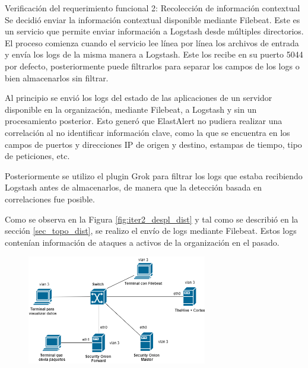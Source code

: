 \begin{section}{Verificación del requerimiento funcional 2: Recolección de información contextual}
    Se decidió enviar la información contextual disponible mediante Filebeat. Este es un servicio que permite enviar información a Logstash desde múltiples directorios. El proceso comienza cuando el servicio lee línea por línea los archivos de entrada y envía los logs de la misma manera a Logstash. Este los recibe en su puerto 5044 por defecto, posteriormente puede filtrarlos para separar los campos de los logs o bien almacenarlos sin filtrar. \par
    Al principio se envió los logs del estado de las aplicaciones de un servidor disponible en la organización, mediante Filebeat, a Logstash y sin un procesamiento posterior. Esto generó que ElastAlert no pudiera realizar una correlación al no identificar información clave, como la que se encuentra en los campos de puertos y direcciones IP de origen y destino, estampas de tiempo, tipo de peticiones, etc.\par
    Posteriormente se utilizo el plugin Grok para filtrar los logs que estaba recibiendo Logstash antes de almacenarlos, de manera que la detección basada en correlaciones fue posible.\par
    Como se observa en la Figura \ref{fig:iter2_despl_dist} y tal como se describió en la sección \ref{sec_topo_dist}, se realizo el envío de logs mediante Filebeat. Estos logs contenían información de ataques a activos de la organización en el pasado. 
    \begin{figure}[H]
    \centering
        \includegraphics[width=0.7\textwidth]{./iteracion_1_imagenes/figura_33_c_topologia_de_prueba_3.png}

\end{figure}
\end{section}
